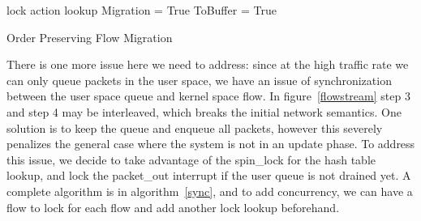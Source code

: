 \begin{algorithm} [ht]
\small
\SetAlgoLined


\mypacket{\packet{} } {
lock\;
action lookup\;
 
  }
\mypacket{\IPC{} } {
  {
  Migration = True\;
  ToBuffer = True\;
  }
}
\func{\queue{}} {
    

} 
\caption{Order Preserving Flow Migration} \label{sync}

\end{algorithm} 


There is one more issue here we need to address: since at the high traffic rate we can only queue packets in the user space, we have an issue of synchronization between the user space queue and kernel space flow. In figure~\ref{flowstream} step 3 and step 4 may be interleaved, which breaks the initial network semantics. One solution is to keep the queue and enqueue all packets, however this severely penalizes the general case where the system is not in an update phase. To address this issue, we decide to take advantage of the spin\_lock for the hash table lookup, and lock the packet\_out interrupt if the user queue is not drained yet. A complete algorithm is in algorithm~\ref{sync}, and to add concurrency, we can have a flow to lock for each flow and add another lock lookup beforehand. 



